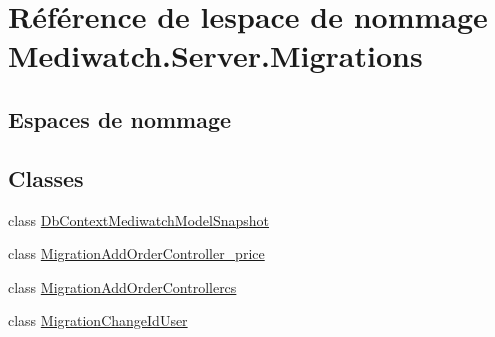 \hypertarget{namespace_mediwatch_1_1_server_1_1_migrations}{}\section{Référence de l\textquotesingle{}espace de nommage Mediwatch.\+Server.\+Migrations}
\label{namespace_mediwatch_1_1_server_1_1_migrations}
\subsection*{Espaces de nommage}
\begin{DoxyCompactItemize}
\end{DoxyCompactItemize}
\subsection*{Classes}
\begin{DoxyCompactItemize}
\item 
class \hyperlink{class_mediwatch_1_1_server_1_1_migrations_1_1_db_context_mediwatch_model_snapshot}{Db\+Context\+Mediwatch\+Model\+Snapshot}
\item 
class \hyperlink{class_mediwatch_1_1_server_1_1_migrations_1_1_migration_add_order_controller__price}{Migration\+Add\+Order\+Controller\+\_\+price}
\item 
class \hyperlink{class_mediwatch_1_1_server_1_1_migrations_1_1_migration_add_order_controllercs}{Migration\+Add\+Order\+Controllercs}
\item 
class \hyperlink{class_mediwatch_1_1_server_1_1_migrations_1_1_migration_change_id_user}{Migration\+Change\+Id\+User}
\end{DoxyCompactItemize}
